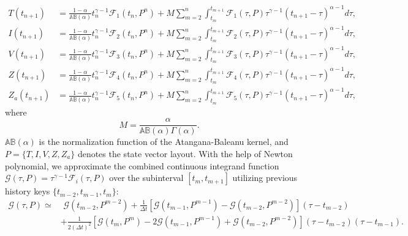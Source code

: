 \documentclass[10pt,a4paper]{amsart}
\numberwithin{equation}{section}
\begin{document}
\begin{equation}
\begin{aligned}
T(t_{n+1}) &= \frac{1-\alpha}{\mathbb{AB}(\alpha)} t_n^{\gamma-1} \mathcal{F}_1(t_n, P^n) + M \sum_{m=2}^{n} \int_{t_m}^{t_{m+1}} \mathcal{F}_1(\tau, P) \tau^{\gamma-1} (t_{n+1} - \tau)^{\alpha-1} d\tau, \\[6pt]
I(t_{n+1}) &= \frac{1-\alpha}{\mathbb{AB}(\alpha)} t_n^{\gamma-1} \mathcal{F}_2(t_n, P^n) + M \sum_{m=2}^{n} \int_{t_m}^{t_{m+1}} \mathcal{F}_2(\tau, P) \tau^{\gamma-1} (t_{n+1} - \tau)^{\alpha-1} d\tau, \\[6pt]
V(t_{n+1}) &= \frac{1-\alpha}{\mathbb{AB}(\alpha)} t_n^{\gamma-1} \mathcal{F}_3(t_n, P^n) + M \sum_{m=2}^{n} \int_{t_m}^{t_{m+1}} \mathcal{F}_3(\tau, P) \tau^{\gamma-1} (t_{n+1} - \tau)^{\alpha-1} d\tau, \\[6pt]
Z(t_{n+1}) &= \frac{1-\alpha}{\mathbb{AB}(\alpha)} t_n^{\gamma-1} \mathcal{F}_4(t_n, P^n) + M \sum_{m=2}^{n} \int_{t_m}^{t_{m+1}} \mathcal{F}_4(\tau, P) \tau^{\gamma-1} (t_{n+1} - \tau)^{\alpha-1} d\tau, \\[6pt]
Z_a(t_{n+1}) &= \frac{1-\alpha}{\mathbb{AB}(\alpha)} t_n^{\gamma-1} \mathcal{F}_5(t_n, P^n) + M \sum_{m=2}^{n} \int_{t_m}^{t_{m+1}} \mathcal{F}_5(\tau, P) \tau^{\gamma-1} (t_{n+1} - \tau)^{\alpha-1} d\tau,
\end{aligned}
\end{equation}
where
\begin{equation*}
    M = \frac{\alpha}{\mathbb{AB}(\alpha)\Gamma(\alpha)}.
\end{equation*}
$\mathbb{AB}(\alpha)$ is the normalization function of the Atangana-Baleanu kernel, and $P = \{T, I, V, Z, Z_a\}$ denotes the state vector layout. With the help of Newton polynomial, we approximate the combined continuous integrand function $\mathcal{G}(\tau, P) = \tau^{\gamma-1}\mathcal{F}_i(\tau, P)$ over the subinterval $[t_m, t_{m+1}]$ utilizing previous history keys $\{t_{m-2}, t_{m-1}, t_m\}$:
\begin{equation}
\begin{aligned}
\mathcal{G}(\tau, P) \simeq & \,\, \mathcal{G}(t_{m-2}, P^{m-2}) + \frac{1}{\Delta t} \left[ \mathcal{G}(t_{m-1}, P^{m-1}) - \mathcal{G}(t_{m-2}, P^{m-2}) \right] (\tau - t_{m-2}) \\
& + \frac{1}{2(\Delta t)^2} \left[ \mathcal{G}(t_m, P^m) - 2\mathcal{G}(t_{m-1}, P^{m-1}) + \mathcal{G}(t_{m-2}, P^{m-2}) \right] (\tau - t_{m-2})(\tau - t_{m-1}).
\end{aligned}
\end{equation}
\end{document}

